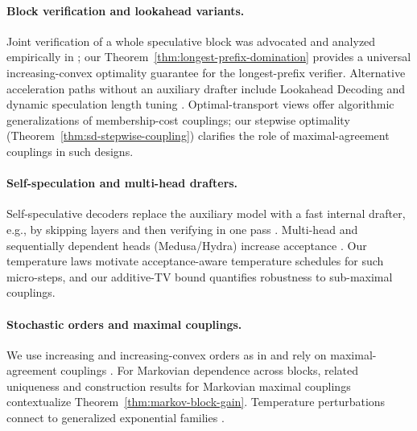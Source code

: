 \documentclass[twoside]{article}
\theoremstyle{plain}
\theoremstyle{definition}
\theoremstyle{remark}
\begin{document}
\paragraph{Block verification and lookahead variants.} Joint verification of a whole speculative block was advocated and analyzed empirically in \cite{Sun2024BlockVerification}; our Theorem~\ref{thm:longest-prefix-domination} provides a universal increasing-convex optimality guarantee for the longest-prefix verifier. Alternative acceleration paths without an auxiliary drafter include Lookahead Decoding \cite{Fu2024Lookahead} and dynamic speculation length tuning \cite{Mamou2024DISCO}. Optimal-transport views \cite{Sun2023SpecTr} offer algorithmic generalizations of membership-cost couplings; our stepwise optimality (Theorem~\ref{thm:sd-stepwise-coupling}) clarifies the role of maximal-agreement couplings in such designs.

\paragraph{Self-speculation and multi-head drafters.} Self-speculative decoders replace the auxiliary model with a fast internal drafter, e.g., by skipping layers and then verifying in one pass \cite{DraftVerifyACL2024}. Multi-head and sequentially dependent heads (Medusa/Hydra) increase acceptance \cite{Ankner2024Hydra}. Our temperature laws motivate acceptance-aware temperature schedules for such micro-steps, and our additive-TV bound quantifies robustness to sub-maximal couplings.

\paragraph{Stochastic orders and maximal couplings.} We use increasing and increasing-convex orders as in \cite{ShakedShanthikumar2007StochasticOrders} and rely on maximal-agreement couplings \cite{Lindvall2002CouplingMethod}. For Markovian dependence across blocks, related uniqueness and construction results for Markovian maximal couplings \cite{BanerjeeKendall2016Rigidity,Boettcher2017MMC} contextualize Theorem~\ref{thm:markov-block-gain}. Temperature perturbations connect to generalized exponential families \cite{Naudts2009QExponentialFamily}.
\end{document}
